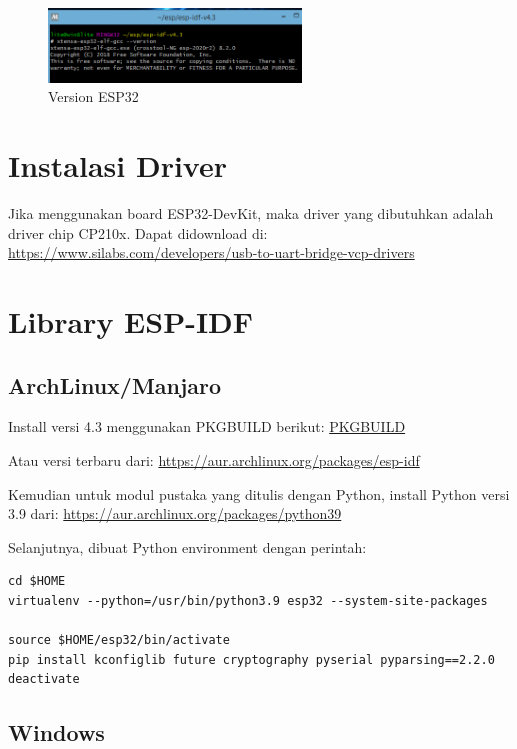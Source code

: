 \documentclass[12pt]{book}
\begin{document}
	\begin{figure}[!ht]
		\centering
		\includegraphics[width=0.6\textwidth]{images/esp/esp32ver}
		\caption{Version ESP32}
	\end{figure}
	
	\section{Instalasi Driver}
	
	Jika menggunakan board ESP32-DevKit, maka driver yang dibutuhkan adalah driver chip CP210x.
	Dapat didownload di: \url{https://www.silabs.com/developers/usb-to-uart-bridge-vcp-drivers}
	
	\section{Library ESP-IDF}
	
	\subsection{ArchLinux/Manjaro}
	
	Install versi 4.3 menggunakan PKGBUILD berikut: \href{https://github.com/mekatronik-achmadi/archlinuxmate/blob/main/pkgbuilds/optional/esp32-idf/PKGBUILD}{PKGBUILD}
	
	Atau versi terbaru dari: \url{https://aur.archlinux.org/packages/esp-idf}
	
	Kemudian untuk modul pustaka yang ditulis dengan Python, install Python versi 3.9 dari: \url{https://aur.archlinux.org/packages/python39}
	
	Selanjutnya, dibuat Python environment dengan perintah:
	
	\begin{verbatim}
cd $HOME
virtualenv --python=/usr/bin/python3.9 esp32 --system-site-packages

source $HOME/esp32/bin/activate
pip install kconfiglib future cryptography pyserial pyparsing==2.2.0
deactivate
	\end{verbatim}
	
	\subsection{Windows}
	
\end{document}
